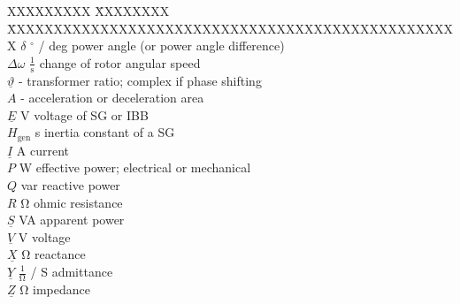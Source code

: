 \begin{tabbing}
    XXXXXXXXX \= XXXXXXXX \= XXXXXXXXXXXXXXXXXXXXXXXXXXXXXXXXXXXXXXXXXXXXXXXXX \kill
    $\delta$                \> $^\circ$ / deg                   \> power angle (or power angle difference) \\
    $\Delta\omega$          \> $\mathrm{\frac{1}{s}}$           \> change of rotor angular speed \\
    $\underline{\vartheta}$ \> -                                \> transformer ratio; complex if phase shifting \\
    $A$                     \> -                                \> acceleration or deceleration area \\
    $\underline{E}$         \> V                                \> voltage of \acs{SG} or \acs{IBB} \\
    $H_\mathrm{gen}$        \> s                                \> inertia constant of a \acf{SG} \\
    $\underline{I}$         \> A                                \> current \\
    $P$                     \> W                                \> effective power; electrical or mechanical \\
    $Q$                     \> var                              \> reactive power \\
    $R$                     \> $\mathrm{\Omega}$                \> ohmic resistance \\
    $\underline{S}$         \> VA                               \> apparent power \\
    $\underline{V}$         \> V                                \> voltage \\
    $\underline{X}$         \> $\mathrm{\Omega}$                \> reactance \\
    $\underline{Y}$         \> $\mathrm{\frac{1}{\Omega}}$ / S  \> admittance \\
    $\underline{Z}$         \> $\mathrm{\Omega}$                \> impedance \\
\end{tabbing}

